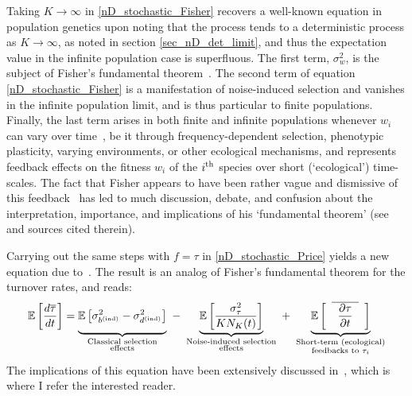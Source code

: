 Taking $K \to \infty$ in \eqref{nD_stochastic_Fisher} recovers a well-known equation in population genetics upon noting that the process tends to a deterministic process as $K \to \infty$, as noted in section \ref{sec_nD_det_limit}, and thus the expectation value in the infinite population case is superfluous. The first term, $\sigma^2_w$, is the subject of Fisher's fundamental theorem~\citep{fisher_genetical_1930,  price_fishers_1972, frank_fishers_1992, kokko_stagnation_2021}. The second term of equation \eqref{nD_stochastic_Fisher} is a manifestation of noise-induced selection and vanishes in the infinite population limit, and is thus particular to finite populations. Finally, the last term arises in both finite and infinite populations whenever $w_i$ can vary over time~\citep{frank_fishers_1992,kokko_stagnation_2021,baez_fundamental_2021}, be it through frequency-dependent selection, phenotypic plasticity, varying environments, or other ecological mechanisms, and represents feedback effects on the fitness $w_i$ of the $i\textsuperscript{th}$ species over short (`ecological') time-scales. The fact that Fisher appears to have been rather vague and dismissive of this feedback~\citep{fisher_genetical_1930} has led to much discussion, debate, and confusion about the interpretation, importance, and implications of his `fundamental theorem' (see~\cite{kokko_stagnation_2021} and sources cited therein).

Carrying out the same steps with $f = \tau$ in \eqref{nD_stochastic_Price} yields a new equation due to~\cite{kuosmanen_turnover_2022}. The result is an analog of Fisher's fundamental theorem for the turnover rates, and reads:
\begin{equation}
\label{nD_stochastic_Fisher_turnover}
\mathbb{E}\left[\frac{d\overline{\tau}}{dt}\right] = \underbrace{\vphantom{ \mathbb{E}\left[\frac{\sigma^2_{\tau}}{KN_K(t)}\right] } \mathbb{E}\left[\sigma^2_{b^{\textrm{(ind)}}} - \sigma^2_{d^{\textrm{(ind)}}}\right]}_{\substack{\text{Classical selection} \\ \text{effects}}} \ - \ \underbrace{ \mathbb{E}\left[\frac{\sigma^2_{\tau}}{KN_K(t)}\right]}_{\substack{\text{Noise-induced selection} \\ \text{effects}}} \ + \ \underbrace{ \vphantom{ \mathbb{E}\left[\frac{\sigma^2_{\tau}}{KN_K(t)}\right] } \mathbb{E}\left[\hphantom{a}\overline{\hphantom{a}\frac{\partial \tau}{\partial t}\hphantom{a}}\hphantom{a}\right]}_{\substack{\text{Short-term (ecological)} \\ \text{feedbacks to $\tau_i$}}}
\end{equation}
The implications of this equation have been extensively discussed in~\cite{kuosmanen_turnover_2022}, which is where I refer the interested reader.

